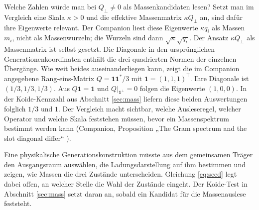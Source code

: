 Welche Zahlen würde man bei \(Q_\perp\ne0\) als Massenkandidaten lesen? Setzt man im Vergleich eine Skala \(\kappa>0\) und die effektive Massenmatrix \(\kappa Q_\perp\) an, sind dafür ihre Eigenwerte relevant. Der Companion liest diese Eigenwerte \(\kappa q_i\) als Massen \(m_i\), nicht als Massenwurzeln; die Wurzeln sind dann \(\sqrt\kappa\sqrt{q_i}\). Der Ansatz \(\kappa Q_\perp\) als Massenmatrix ist selbst gesetzt. Die Diagonale in den ursprünglichen Generationenkoordinaten enthält die drei quadrierten Normen der einzelnen Übergänge. Wie weit beides auseinanderliegen kann, zeigt die im Companion angegebene Rang-eins-Matrix \(Q=\mathbf1\mathbf1^*/3\) mit \(\mathbf1=(1,1,1)^{\mathsf T}\). Ihre Diagonale ist \((1/3,1/3,1/3)\). Aus \(Q\mathbf1=\mathbf1\) und \(Q|_{\mathbf1^\perp}=0\) folgen die Eigenwerte \((1,0,0)\). In der Koide-Kennzahl aus Abschnitt \ref{sec:mass} liefern diese beiden Auswertungen folglich \(1/3\) und \(1\). Der Vergleich macht sichtbar, welche Ausleseregel, welcher Operator und welche Skala feststehen müssen, bevor ein Massenspektrum bestimmt werden kann (Companion, Proposition „The Gram spectrum and the slot diagonal differ“ \cite{companion,repo}).

Eine physikalische Generationskonstruktion müsste aus dem gemeinsamen Träger den Ausgangsraum auswählen, die Ladungsdarstellung auf ihm bestimmen und zeigen, wie Massen die drei Zustände unterscheiden. Gleichung \eqref{eq:seed} legt dabei offen, an welcher Stelle die Wahl der Zustände eingeht. Der Koide-Test in Abschnitt \ref{sec:mass} setzt daran an, sobald ein Kandidat für die Massenauslese feststeht.

